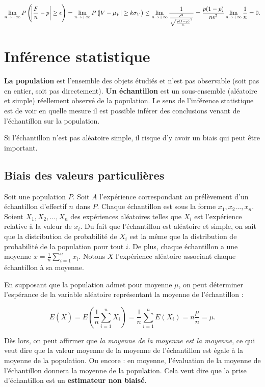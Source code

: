 \documentclass{article}
\begin{document}
		\[\lim_{n\to+\infty}P\left(\abs{\frac Fn - p} \geq \epsilon\right) = \lim_{n\to+\infty}P\left(\abs{V-\mu_V} \geq k\sigma_V\right) \leq \lim_{n\to+\infty}\frac 1{\frac {\epsilon^2}{\sqrt{\frac {p(1-p)}n}^2}} = \frac {p(1-p)}{n\epsilon^2}\lim_{n\to+\infty}\frac 1n = 0.\]
	
\section{Inférence statistique}
	\textbf{La population} est l'ensemble des objets étudiés et n'est pas observable (soit pas en entier, soit pas directement). \textbf{Un échantillon} est un sous-ensemble (aléatoire et simple)
	réellement observé de la population. Le sens de l'inférence statistique est de voir en quelle mesure il est possible inférer des conclusions venant de l'échantillon sur la population.

	Si l'échantillon n'est pas aléatoire simple, il risque d'y avoir un biais qui peut être important.

	\subsection{Biais des valeurs particulières}
		Soit une population $P$. Soit $A$ l'expérience correspondant au prélèvement d'un échantillon d'effectif $n$ dans $P$. Chaque échantillon est sous la forme $x_1, x_2 \ldots, x_n$.
		Soient $X_1, X_2, \ldots, X_n$ des expériences aléatoires telles que $X_i$ est l'expérience relative à la valeur de $x_i$. Du fait que l'échantillon est aléatoire et simple, on
		sait que la distribution de probabilité de $X_i$ est la même que la distribution de probabilité de la population pour tout $i$. De plus, chaque échantillon a une moyenne
		$\overline x = \frac 1n\sum_{i=1}^nx_i$. Notons $\overline X$ l'expérience aléatoire associant chaque échantillon à sa moyenne.

		En supposant que la population admet pour moyenne $\mu$, on peut déterminer l'espérance de la variable aléatoire représentant la moyenne de l'échantillon :

		\[E(\overline X) = E\left(\frac 1n\sum_{i=1}^nX_i\right) = \frac 1n\sum_{i=1}^nE(X_i) = n\frac \mu n = \mu.\]

		Dès lors, on peut affirmer que \textit{la moyenne de la moyenne est la moyenne}, ce qui veut dire que la valeur moyenne de la moyenne de l'échantillon est égale à la moyenne de la population.
		Ou encore : en moyenne, l'évaluation de la moyenne de l'échantillon donnera la moyenne de la population. Cela veut dire que la prise d'échantillon est un \textbf{estimateur non biaisé}.
\end{document}
